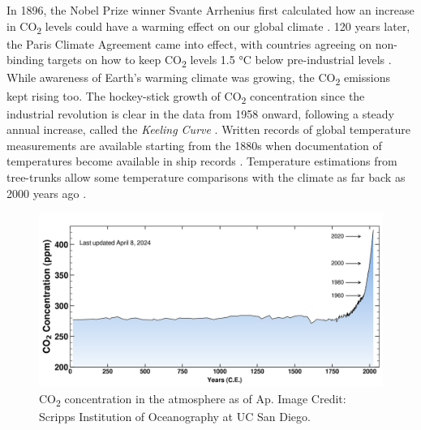 \documentclass[
  letterpaper,
  DIV=11,
  numbers=noendperiod]{scrartcl}
\begin{document}
In 1896, the Nobel Prize winner Svante Arrhenius first calculated how an
increase in CO\textsubscript{2} levels could have a warming effect on
our global climate
\citep{andersonCO2GreenhouseEffect2016, wulffPetterLegacy2020}. 120
years later, the Paris Climate Agreement came into effect, with
countries agreeing on non-binding targets on how to keep
CO\textsubscript{2} levels 1.5 °C below pre-industrial levels
\citep{unitednationsParisAgreement2016}. While awareness of Earth's
warming climate was growing, the CO\textsubscript{2} emissions kept
rising too. The hockey-stick growth of CO\textsubscript{2} concentration
since the industrial revolution is clear in the data from 1958 onward,
following a steady annual increase, called the \emph{Keeling Curve}
\citep{keelingAtmosphericMonthlySitu2017}. Written records of global
temperature measurements are available starting from the 1880s when
documentation of temperatures become available in ship records
\citep{BrohanClimate2012}. Temperature estimations from tree-trunks
allow some temperature comparisons with the climate as far back as 2000
years ago \citep{rubinoLawDomeIce2019}.

\begin{figure}[H]

{\centering \includegraphics{./images/co2-concentration.png}

}

\caption{CO\textsubscript{2} concentration in the atmosphere as of Ap.
Image Credit: Scripps Institution of Oceanography at UC San Diego.}

\end{figure}%
\end{document}
